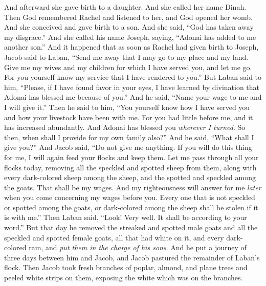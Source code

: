 \begin{biblechapter}
\verse And afterward she gave birth to a daughter. And she called her name Dinah.
\verse Then God remembered Rachel and listened to her, and God opened her womb.
\verse And she conceived and gave birth to a son. And she said, “God has taken away my disgrace.”
\verse And she called his name Joseph, saying, “Adonai has added to me another son.”
 And it happened that as soon as Rachel had given birth to Joseph, Jacob said to Laban, “Send me away that I may go to my place and my land.
\verse Give me my wives and my children for which I have served you, and let me go. For you yourself know my service that I have rendered to you.”
\verse But Laban said to him, “Please, if I have found favor in your eyes, I have learned by divination that Adonai has blessed me because of you.”
\verse And he said, “Name your wage to me and I will give it.”
\verse Then he said to him, “You yourself know how I have served you and how your livestock have been with me.
\verse For you had little before me, and it has increased abundantly. And Adonai has blessed you \textit{wherever I turned}. So then, when shall I provide for my own family also?”
\verse And he said, “What shall I give you?” And Jacob said, “Do not give me anything. If you will do this thing for me, I will again feed your flocks and keep them.
\verse Let me pass through all your flocks today, removing all the speckled and spotted sheep from them, along with every dark-colored sheep among the sheep, and the spotted and speckled among the goats. That shall be my wages.
\verse And my righteousness will answer for me \textit{later} when you come concerning my wages before you. Every one that is not speckled or spotted among the goats, or dark-colored among the sheep shall be stolen if it is with me.”
\verse Then Laban said, “Look! Very well. It shall be according to your word.”
\verse But that day he removed the streaked and spotted male goats and all the speckled and spotted female goats, all that had white on it, and every dark-colored ram, and \textit{put them in the charge of his sons}.
\verse And he put a journey of three days between him and Jacob, and Jacob pastured the remainder of Laban’s flock.
\verse Then Jacob took fresh branches of poplar, almond, and plane trees and peeled white strips on them, exposing the white which was on the branches.

\end{biblechapter}

